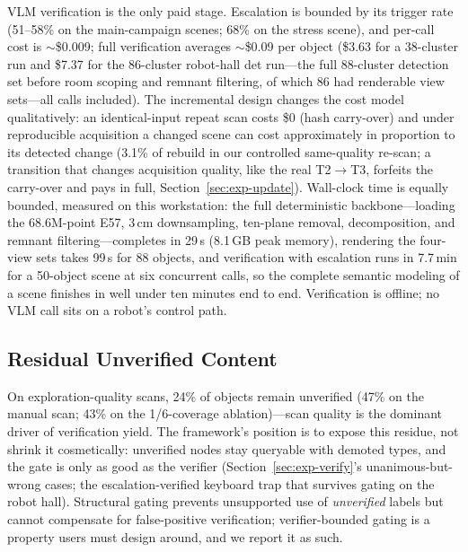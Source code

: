 \documentclass[electronics,article,accept,pdftex,moreauthors]{Definitions/mdpi}
\begin{document}
VLM verification is the only paid stage. Escalation is bounded by its
trigger rate (51--58\% on the main-campaign scenes; 68\% on the stress
scene), and per-call cost is $\sim$\$0.009;
full verification averages $\sim$\$0.09 per object (\$3.63 for a 38-cluster
run and \$7.37 for the 86-cluster robot-hall det run---the full 88-cluster
detection set before room scoping and remnant filtering, of which 86 had
renderable view sets---all calls included). The incremental
design changes
the cost model qualitatively: an identical-input repeat scan costs \$0
(hash carry-over) and
under reproducible acquisition a changed scene can cost approximately in
proportion to its detected change (3.1\% of rebuild in our
controlled same-quality re-scan; a transition that changes acquisition
quality, like the real T2$\rightarrow$T3, forfeits the carry-over and pays
in full, Section~\ref{sec:exp-update}). Wall-clock time is equally bounded, measured on this
workstation: the full deterministic backbone---loading the 68.6M-point
E57, 3\,cm downsampling, ten-plane removal, decomposition, and remnant
filtering---completes in 29\,s (8.1\,GB peak memory), rendering the
four-view sets takes 99\,s for 88 objects, and verification with
escalation runs in 7.7\,min for a 50-object scene at six concurrent
calls, so the complete semantic modeling of a scene finishes in well
under ten minutes end to end.
Verification is offline; no VLM call sits on a robot's control
path.

\subsection{Residual Unverified Content}
On exploration-quality scans, 24\% of objects remain unverified (47\% on the
manual scan; 43\% on the 1/6-coverage ablation)---scan quality is the
dominant driver of verification yield. The framework's position is to expose
this residue, not shrink it cosmetically: unverified nodes stay queryable
with demoted types, and the gate is only as good as the verifier
(Section~\ref{sec:exp-verify}'s unanimous-but-wrong cases; the escalation-verified keyboard trap
that survives gating on the robot hall). Structural gating prevents
unsupported use of \emph{unverified} labels but cannot compensate for
false-positive verification; verifier-bounded gating is a
property users must design around, and we report it as such.
\end{document}
